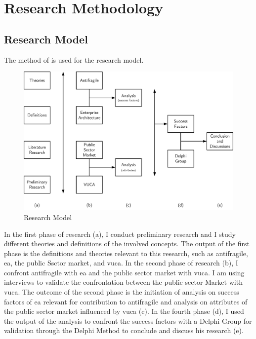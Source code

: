 \chapter{Research Methodology}
\label{ch:research-methodology}

\section{Research Model}
\label{sec:research-model}
The method of \textcite{Verschuren2016} is used for the research model.
	\begin{figure}[h]
		\centering
		\includegraphics[width=12cm]{images/research-model.png}
		\caption[Research Model]{Research Model}
		\label{fig:research-model}
	\end{figure}

In the first phase of research (a), I conduct preliminary research and I study different theories and definitions of the involved concepts. The output of the first phase is the definitions and theories relevant to this research, such as \gls{antifragile}, \acrlong{ea}, the public Ssctor market, and \acrshort{vuca}. In the second phase of research (b), I confront \gls{antifragile} with \acrlong{ea} and the public sector market with \acrshort{vuca}. I am using interviews to validate the confrontation between the public sector Market with \acrshort{vuca}. The outcome of the second phase is the initiation of analysis on success factors of \acrlong{ea} relevant for contribution to \gls{antifragile} and analysis on attributes of the public sector market influenced by \acrshort{vuca} (c). In the fourth phase (d), I used the output of the analysis to confront the success factors with a Delphi Group for validation through the Delphi Method to conclude and discuss his research (e).

